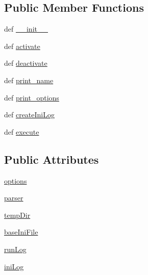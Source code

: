 \subsection*{Public Member Functions}
\begin{DoxyCompactItemize}
\item 
def \hyperlink{classcombinatorial_1_1CombinatorialEx_a9a4fbfcf64b1204c14509d348dd23b5d}{\-\_\-\-\_\-init\-\_\-\-\_\-}
\item 
def \hyperlink{classcombinatorial_1_1CombinatorialEx_a8d0b7c0da355183d8124871bee76b0bd}{activate}
\item 
def \hyperlink{classcombinatorial_1_1CombinatorialEx_ad53efcff93773cce7ed9cfc2fef38ab3}{deactivate}
\item 
def \hyperlink{classcombinatorial_1_1CombinatorialEx_a19f6321bf42ab92280c5e3b0a3af89d0}{print\-\_\-name}
\item 
def \hyperlink{classcombinatorial_1_1CombinatorialEx_ae802ad33a050ada42292e7c80fb3e486}{print\-\_\-options}
\item 
def \hyperlink{classcombinatorial_1_1CombinatorialEx_ac0216f0d0041c35a91e01ac9dafd49da}{create\-Ini\-Log}
\item 
def \hyperlink{classcombinatorial_1_1CombinatorialEx_a5a5fbd1692c100374ee458e4babc9832}{execute}
\end{DoxyCompactItemize}
\subsection*{Public Attributes}
\begin{DoxyCompactItemize}
\item 
\hyperlink{classcombinatorial_1_1CombinatorialEx_a20eda525b3947495bb6084c560dcca27}{options}
\item 
\hyperlink{classcombinatorial_1_1CombinatorialEx_ab5c27fece8991a34f47e85870637fc91}{parser}
\item 
\hyperlink{classcombinatorial_1_1CombinatorialEx_a24b3bc621a8380e406bade192bc371d4}{temp\-Dir}
\item 
\hyperlink{classcombinatorial_1_1CombinatorialEx_a68e6ac6cba4ab4161dd854323e549afd}{base\-Ini\-File}
\item 
\hyperlink{classcombinatorial_1_1CombinatorialEx_a3de3f7da4c201525da8452258df0bc7b}{run\-Log}
\item 
\hyperlink{classcombinatorial_1_1CombinatorialEx_a961a46d05fda7be52ea74a5f69df57e2}{ini\-Log}
\end{DoxyCompactItemize}


